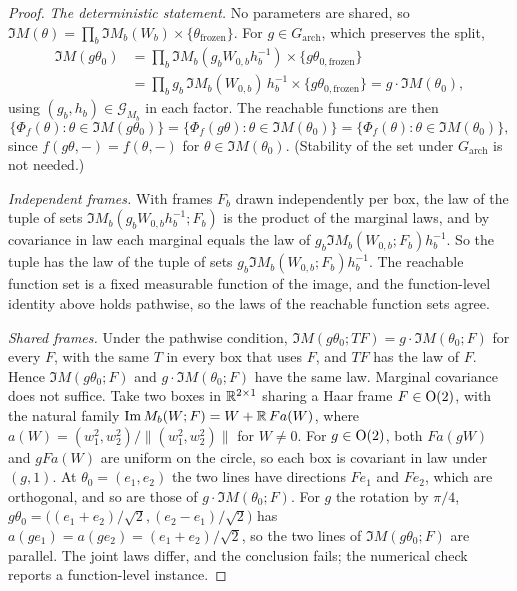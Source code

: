 \begin{proof}
\emph{The deterministic statement.} No parameters are shared, so $\Im M(\theta)=\prod_b\Im M_b(W_b)\times\{\theta_{\mathrm{frozen}}\}$.
For $g\in G_{\mathrm{arch}}$, which preserves the split,
\begin{align*}
  \Im M(g\theta_0)&=\prod_b\Im M_b(g_bW_{0,b}h_b^{-1})\times\{g\theta_{0,\mathrm{frozen}}\}\\
  &=\prod_bg_b\,\Im M_b(W_{0,b})\,h_b^{-1}\times\{g\theta_{0,\mathrm{frozen}}\}=g\cdot\Im M(\theta_0),
\end{align*}
using $(g_b,h_b)\in\mathcal G_{M_b}$ in each factor. The reachable functions are then
\begin{equation*}
  \{\Phi_f(\theta):\theta\in\Im M(g\theta_0)\}=\{\Phi_f(g\theta):\theta\in\Im M(\theta_0)\}=\{\Phi_f(\theta):\theta\in\Im M(\theta_0)\},
\end{equation*}
since $f(g\theta,-)=f(\theta,-)$ for $\theta\in\Im M(\theta_0)$. (Stability of the set under $G_{\mathrm{arch}}$ is not needed.)

\emph{Independent frames.} With frames $F_b$ drawn independently per box, the law of the tuple of sets
$\Im M_b(g_bW_{0,b}h_b^{-1};F_b)$ is the product of the marginal laws, and by covariance in law each marginal equals the law of
$g_b\Im M_b(W_{0,b};F_b)h_b^{-1}$. So the tuple has the law of the tuple of sets $g_b\Im M_b(W_{0,b};F_b)h_b^{-1}$. The reachable function set is a fixed measurable function of the
image, and the function-level identity above holds pathwise, so the laws of the reachable function sets agree.

\emph{Shared frames.} Under the pathwise condition, $\Im M(g\theta_0;TF)=g\cdot\Im M(\theta_0;F)$ for every $F$, with the same $T$
in every box that uses $F$, and $TF$ has the law of $F$. Hence $\Im M(g\theta_0;F)$ and $g\cdot\Im M(\theta_0;F)$ have the same
law. Marginal covariance does not suffice. Take two boxes in $\mathbb{R}^{2\times1}$ sharing a Haar frame $F\in\mathrm{O}(2)$, with the
natural family $\operatorname{Im} M_b(W;F)=W+\mathbb{R}\,Fa(W)$, where $a(W)=(w_1^2,w_2^2)/\lVert(w_1^2,w_2^2)\rVert$ for $W\ne0$. For $g\in\mathrm{O}(2)$,
both $Fa(gW)$ and $gFa(W)$ are uniform on the circle, so each box is covariant in law under $(g,1)$. At $\theta_0=(e_1,e_2)$ the
two lines have directions $Fe_1$ and $Fe_2$, which are orthogonal, and so are those of $g\cdot\Im M(\theta_0;F)$. For $g$ the
rotation by $\pi/4$, $g\theta_0=\big((e_1+e_2)/\sqrt2,(e_2-e_1)/\sqrt2\big)$ has $a(ge_1)=a(ge_2)=(e_1+e_2)/\sqrt2$, so the two
lines of $\Im M(g\theta_0;F)$ are parallel. The joint laws differ, and the conclusion fails; the numerical check reports a
function-level instance.


\end{proof}
